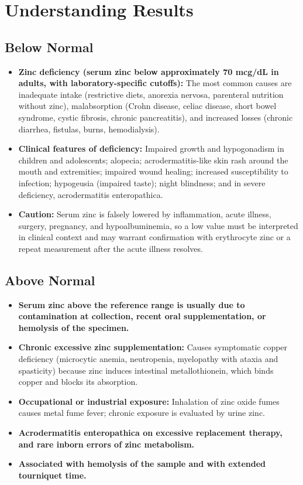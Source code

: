 \section*{Understanding Results}

\subsection*{Below Normal}
\begin{itemize}
  \item \textbf{Zinc deficiency (serum zinc below approximately 70 mcg/dL in adults, with laboratory-specific cutoffs):} The most common causes are inadequate intake (restrictive diets, anorexia nervosa, parenteral nutrition without zinc), malabsorption (Crohn disease, celiac disease, short bowel syndrome, cystic fibrosis, chronic pancreatitis), and increased losses (chronic diarrhea, fistulas, burns, hemodialysis).
  \item \textbf{Clinical features of deficiency:} Impaired growth and hypogonadism in children and adolescents; alopecia; acrodermatitis-like skin rash around the mouth and extremities; impaired wound healing; increased susceptibility to infection; hypogeusia (impaired taste); night blindness; and in severe deficiency, acrodermatitis enteropathica.
  \item \textbf{Caution:} Serum zinc is falsely lowered by inflammation, acute illness, surgery, pregnancy, and hypoalbuminemia, so a low value must be interpreted in clinical context and may warrant confirmation with erythrocyte zinc or a repeat measurement after the acute illness resolves.
\end{itemize}

\subsection*{Above Normal}
\begin{itemize}
  \item \textbf{Serum zinc above the reference range is usually due to contamination at collection, recent oral supplementation, or hemolysis of the specimen.}
  \item \textbf{Chronic excessive zinc supplementation:} Causes symptomatic copper deficiency (microcytic anemia, neutropenia, myelopathy with ataxia and spasticity) because zinc induces intestinal metallothionein, which binds copper and blocks its absorption.
  \item \textbf{Occupational or industrial exposure:} Inhalation of zinc oxide fumes causes metal fume fever; chronic exposure is evaluated by urine zinc.
  \item \textbf{Acrodermatitis enteropathica on excessive replacement therapy, and rare inborn errors of zinc metabolism.}
  \item \textbf{Associated with hemolysis of the sample and with extended tourniquet time.}
\end{itemize}

